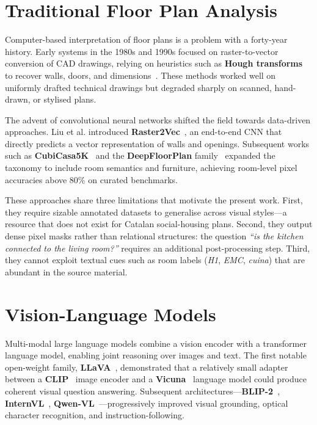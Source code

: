 \documentclass[12pt,a4paper,openright]{report}
\begin{document}
\section{Traditional Floor Plan Analysis}

Computer-based interpretation of floor plans is a problem with a forty-year history. Early systems in the 1980s and 1990s focused on raster-to-vector conversion of CAD drawings, relying on heuristics such as \textbf{Hough transforms} to recover walls, doors, and dimensions~\cite{ahmedFloorPlan2011}. These methods worked well on uniformly drafted technical drawings but degraded sharply on scanned, hand-drawn, or stylised plans.

The advent of convolutional neural networks shifted the field towards data-driven approaches. Liu et al. introduced \textbf{Raster2Vec}~\cite{liuRaster2Vec2017}, an end-to-end CNN that directly predicts a vector representation of walls and openings. Subsequent works such as \textbf{CubiCasa5K}~\cite{kalervo2019cubicasa5kdatasetimprovedmultitask} and the \textbf{DeepFloorPlan} family~\cite{zeng2019deepfloorplanrecognition} expanded the taxonomy to include room semantics and furniture, achieving room-level pixel accuracies above 80\% on curated benchmarks.

These approaches share three limitations that motivate the present work. First, they require sizable annotated datasets to generalise across visual styles---a resource that does not exist for Catalan social-housing plans. Second, they output dense pixel masks rather than relational structures: the question \textit{``is the kitchen connected to the living room?''} requires an additional post-processing step. Third, they cannot exploit textual cues such as room labels (\textit{H1}, \textit{EMC}, \textit{cuina}) that are abundant in the source material.

\section{Vision-Language Models}

Multi-modal large language models combine a vision encoder with a transformer language model, enabling joint reasoning over images and text. The first notable open-weight family, \textbf{LLaVA}~\cite{liu2023llava}, demonstrated that a relatively small adapter between a \textbf{CLIP}~\cite{radford2021learningtransferablevisualmodels} image encoder and a \textbf{Vicuna}~\cite{vicuna2023} language model could produce coherent visual question answering. Subsequent architectures---\textbf{BLIP-2}~\cite{li2023blip2bootstrappinglanguageimagepretraining}, \textbf{InternVL}~\cite{chen2024internvlscalingvisionfoundation}, \textbf{Qwen-VL}~\cite{bai2023qwenvlversatilevisionlanguagemodel}---progressively improved visual grounding, optical character recognition, and instruction-following.
\end{document}
